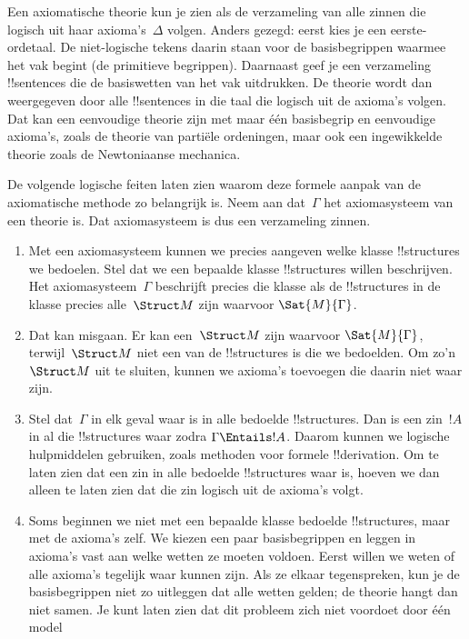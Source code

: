 \documentclass[../../../include/open-logic-section]{subfiles}
\begin{document}
\begin{explain}
Een axiomatische theorie kun je zien als de verzameling van alle zinnen
die logisch uit haar axioma's~$\Delta$ volgen. Anders gezegd: eerst
kies je een eerste-ordetaal. De niet-logische tekens daarin staan voor
de basisbegrippen waarmee het vak begint (de primitieve begrippen).
Daarnaast geef je een verzameling !!{sentence}s die de basiswetten van
het vak uitdrukken. De theorie wordt dan weergegeven door alle
!!{sentence}s in die taal die logisch uit de axioma's volgen. Dat kan
een eenvoudige theorie zijn met maar één basisbegrip en eenvoudige
axioma's, zoals de theorie van partiële ordeningen, maar ook een
ingewikkelde theorie zoals de Newtoniaanse mechanica.

De volgende logische feiten laten zien waarom deze formele aanpak van
de axiomatische methode zo belangrijk is. Neem aan dat~$\Gamma$ het
axiomasysteem van een theorie is. Dat axiomasysteem is dus een
verzameling zinnen.
\begin{enumerate}
\item Met een axiomasysteem kunnen we precies aangeven welke klasse
  !!{structure}s we bedoelen. Stel dat we een bepaalde klasse
  !!{structure}s willen beschrijven. Het axiomasysteem~$\Gamma$
  beschrijft precies die klasse als de !!{structure}s in de klasse
  precies alle~$\Struct M$ zijn waarvoor $\Sat{M}{\Gamma}$.
\item Dat kan misgaan. Er kan een~$\Struct M$ zijn waarvoor
  $\Sat{M}{\Gamma}$, terwijl~$\Struct M$ niet een van de
  !!{structure}s is die we bedoelden. Om zo'n~$\Struct M$ uit te
  sluiten, kunnen we axioma's toevoegen die daarin niet waar zijn.
\item Stel dat~$\Gamma$ in elk geval waar is in alle bedoelde
  !!{structure}s. Dan is een zin~$!A$ in al die !!{structure}s waar
  zodra $\Gamma \Entails !A$. Daarom kunnen we logische hulpmiddelen
  gebruiken, zoals methoden voor formele !!{derivation}. Om te laten
  zien dat een zin in alle bedoelde !!{structure}s waar is, hoeven we
  dan alleen te laten zien dat die zin logisch uit de axioma's volgt.
\item Soms beginnen we niet met een bepaalde klasse bedoelde
  !!{structure}s, maar met de axioma's zelf. We kiezen een paar
  basisbegrippen en leggen in axioma's vast aan welke wetten ze moeten
  voldoen. Eerst willen we weten of alle axioma's tegelijk waar kunnen
  zijn. Als ze elkaar tegenspreken, kun je de basisbegrippen niet zo
  uitleggen dat alle wetten gelden; de theorie hangt dan niet samen.
  Je kunt laten zien dat dit probleem zich niet voordoet door één model

\end{enumerate}
\end{explain}
\end{document}

